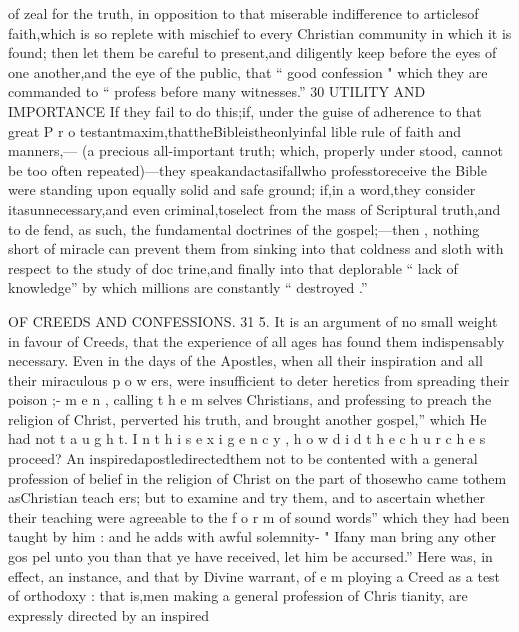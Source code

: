 \documentclass[
]{book}
\begin{document}
of zeal for the truth, in opposition to that miserable indifference to articlesof faith,which is so replete with mischief to every Christian community in which it is found; then let them be careful to present,and diligently keep before the eyes of one another,and the eye of the public, that `` good confession "
which they are commanded to `` profess before many witnesses.''
30 UTILITY AND IMPORTANCE
If they fail to do this;if,
under the guise of adherence to that great P r o testantmaxim,thattheBibleistheonlyinfal lible rule of faith and manners,--- (a precious all-important truth; which, properly under stood, cannot be too often repeated)---they speakandactasifallwho professtoreceive the Bible were standing upon equally solid and safe ground; if,in a word,they consider itasunnecessary,and even criminal,toselect from the mass of Scriptural truth,and to de fend, as such, the fundamental doctrines of the gospel;---then , nothing short of miracle can prevent them from sinking into that coldness and sloth with respect to the study of doc
trine,and finally into that deplorable `` lack of
knowledge'' by which millions are constantly `` destroyed .''

OF CREEDS AND CONFESSIONS. 31
5. It is an argument of no small weight in favour of Creeds, that the experience of all ages has found them indispensably necessary.
Even in the days of the Apostles, when all
their inspiration and all their miraculous p o w ers, were insufficient to deter heretics from
spreading their poison ;- m e n , calling t h e m selves Christians, and professing to preach the
religion of Christ, perverted his truth, and brought another gospel,'' which He had not t a u g h t. I n t h i s e x i g e n c y , h o w d i d t h e c h u r c h e s proceed? An inspiredapostledirectedthem not to be contented with a general profession of belief in the religion of Christ on the part of thosewho came tothem asChristian teach ers; but to examine and try them, and to ascertain whether their teaching were agreeable to the f o r m of sound words'' which they had
been taught by him : and he adds with awful solemnity- " Ifany man bring any other gos pel unto you than that ye have received, let him be accursed.'' Here was, in effect, an
instance, and that by Divine warrant, of e m
ploying a Creed as a test of orthodoxy : that is,men making a general profession of Chris
tianity, are expressly directed by an inspired
\end{document}
